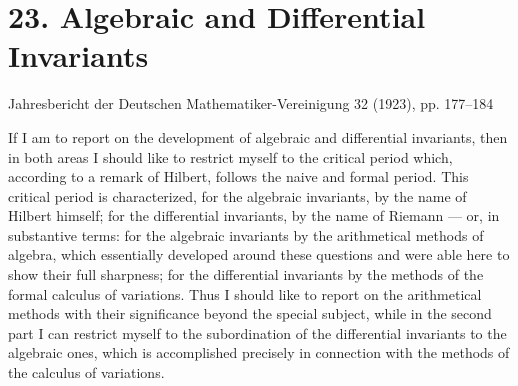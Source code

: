 \documentclass[11pt]{article}
\begin{document}
\setcounter{footnote}{0}

\section*{23. Algebraic and Differential Invariants}
\begin{center}
Jahresbericht der Deutschen Mathematiker-Vereinigung 32 (1923), pp. 177--184
\end{center}

If I am to report on the development of algebraic and differential invariants, then in both areas I should like to restrict myself to the critical period which, according to a remark of Hilbert, follows the naive and formal period. This critical period is characterized, for the algebraic invariants, by the name of Hilbert himself; for the differential invariants, by the name of Riemann --- or, in substantive terms: for the algebraic invariants by the arithmetical methods of algebra, which essentially developed around these questions and were able here to show their full sharpness; for the differential invariants by the methods of the formal calculus of variations. Thus I should like to report on the arithmetical methods with their significance beyond the special subject, while in the second part I can restrict myself to the subordination of the differential invariants to the algebraic ones, which is accomplished precisely in connection with the methods of the calculus of variations.
\end{document}
